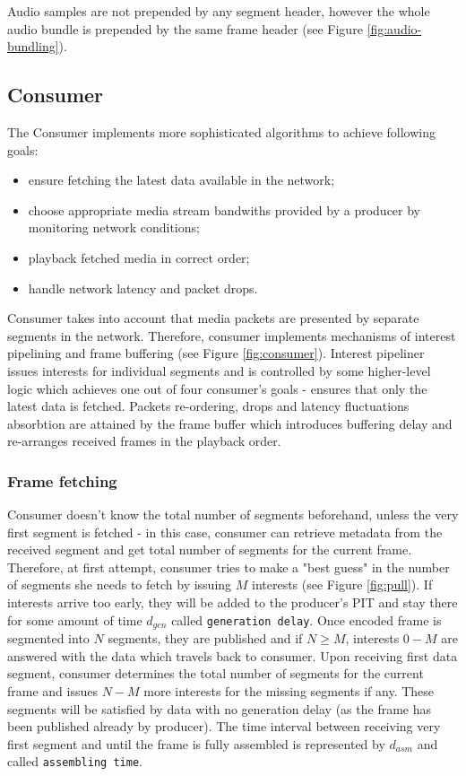\documentclass{icn/sig-alternate-2012} %
\begin{document}
Audio samples are not prepended by any segment header, however the whole audio bundle is prepended by the same frame header (see Figure \ref{fig:audio-bundling}).

\subsection{Consumer}

The Consumer implements more sophisticated algorithms to achieve following goals:
\begin{itemize}
\item ensure fetching the latest data available in the network; 
\item choose appropriate media stream bandwiths provided by a producer by monitoring network conditions;
\item playback fetched media in correct order;
\item handle network latency and packet drops.
\end{itemize}

Consumer takes into account that media packets are presented by separate segments in the network. Therefore, consumer implements mechanisms of interest pipelining and frame buffering (see Figure \ref{fig:consumer}). Interest pipeliner issues interests for individual segments and is controlled by some higher-level logic which achieves one out of four consumer's goals - ensures that only the latest data is fetched. Packets re-ordering, drops and latency fluctuations absorbtion are attained by the frame buffer which introduces buffering delay and re-arranges received frames in the playback order.



\subsubsection{Frame fetching}

Consumer doesn't know the total number of segments beforehand, unless the very first segment is fetched - in this case, consumer can retrieve metadata from the received segment and get total number of segments for the current frame. 
Therefore, at first attempt, consumer tries to make a "best guess" in the number of segments she needs to fetch by issuing $M$ interests (see Figure \ref{fig:pull}). If interests arrive too early, they will be added to the producer's PIT and stay there for some amount of time $d_{gen}$ called \texttt{generation delay}. Once encoded frame is segmented into $N$ segments, they are published and if $N\geq M$, interests $0 - M$ are answered with the data  which travels back to consumer. Upon receiving first data segment, consumer determines the total number of segments for the current frame and issues $N - M$ more interests for the missing segments if any. These segments will be satisfied by data with no generation delay (as the frame has been published already by producer). The time interval between receiving very first segment and until the frame is fully assembled is represented by $d_{asm}$ and called \texttt{assembling time}.
\end{document}
